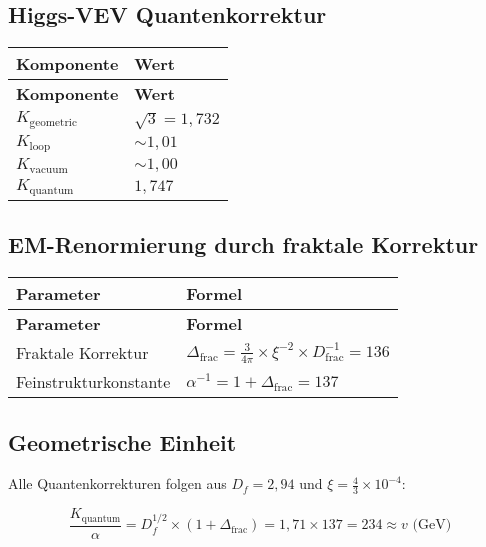 \documentclass[12pt,a4paper]{article}
\begin{document}
	\subsection{Higgs-VEV Quantenkorrektur}
	
	\begin{longtable}{|p{3cm}|p{4cm}|}
		\hline
		\textbf{Komponente} & \textbf{Wert} \\
		\hline
		\endfirsthead
		\hline
		\textbf{Komponente} & \textbf{Wert} \\
		\hline
		\endhead
		\(K_{\text{geometric}}\) & \(\sqrt{3} = 1{,}732\) \\
		\hline
		\(K_{\text{loop}}\) & \(\sim 1{,}01\) \\
		\hline
		\(K_{\text{vacuum}}\) & \(\sim 1{,}00\) \\
		\hline
		\(K_{\text{quantum}}\) & \(1{,}747\) \\
		\hline
	\end{longtable}
	
	\subsection{EM-Renormierung durch fraktale Korrektur}
	
	\begin{longtable}{|p{4cm}|p{5cm}|}
		\hline
		\textbf{Parameter} & \textbf{Formel} \\
		\hline
		\endfirsthead
		\hline
		\textbf{Parameter} & \textbf{Formel} \\
		\hline
		\endhead
		Fraktale Korrektur & \(\Delta_{\text{frac}} = \frac{3}{4\pi} \times \xi^{-2} \times D_{\text{frac}}^{-1} = 136\) \\
		\hline
		Feinstrukturkonstante & \(\alpha^{-1} = 1 + \Delta_{\text{frac}} = 137\) \\
		\hline
	\end{longtable}
	
	\subsection{Geometrische Einheit}
	
	Alle Quantenkorrekturen folgen aus \(D_f = 2{,}94\) und \(\xi = \frac{4}{3} \times 10^{-4}\):
	
	\begin{equation}
		\frac{K_{\text{quantum}}}{\alpha} = D_f^{1/2} \times (1 + \Delta_{\text{frac}}) = 1{,}71 \times 137 = 234 \approx v \text{ (GeV)}
	\end{equation}
	
\end{document}
